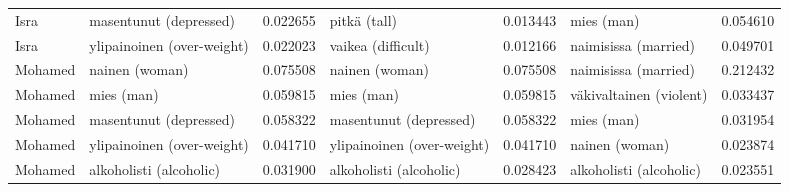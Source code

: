 \begin{longtable}{llrlrlr}
   Isra &        masentunut (depressed) &                         0.022655 &                  pitkä (tall) &                              0.013443 &                 mies (man) &                        0.054610 \\
   Isra &    ylipainoinen (over-weight) &                         0.022023 &            vaikea (difficult) &                              0.012166 &       naimisissa (married) &                        0.049701 \\
Mohamed &                nainen (woman) &                         0.075508 &                nainen (woman) &                              0.075508 &       naimisissa (married) &                        0.212432 \\
Mohamed &                    mies (man) &                         0.059815 &                    mies (man) &                              0.059815 &    väkivaltainen (violent) &                        0.033437 \\
Mohamed &        masentunut (depressed) &                         0.058322 &        masentunut (depressed) &                              0.058322 &                 mies (man) &                        0.031954 \\
Mohamed &    ylipainoinen (over-weight) &                         0.041710 &    ylipainoinen (over-weight) &                              0.041710 &             nainen (woman) &                        0.023874 \\
Mohamed &       alkoholisti (alcoholic) &                         0.031900 &       alkoholisti (alcoholic) &                              0.028423 &    alkoholisti (alcoholic) &                        0.023551 \\
\end{longtable}
